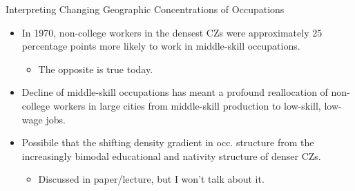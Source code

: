 \documentclass{beamer}
\begin{document}
\begin{frame}{Interpreting Changing Geographic Concentrations of Occupations}

\begin{itemize}
	
	\item In 1970, non-college workers in the densest CZs were approximately 25 percentage points more likely to work in middle-skill occupations.
	\begin{itemize}
		\item The opposite is true today.
	\end{itemize}
	
	\bigskip
	
	\item Decline of middle-skill occupations has meant a profound reallocation of non-college workers in large cities from middle-skill production to low-skill, low-wage jobs.
	
	\bigskip
	
	\item Possibile that the shifting density gradient in occ. structure from the increasingly bimodal educational and nativity structure of denser CZs.
	\begin{itemize}
		\item Discussed in paper/lecture, but I won't talk about it.
	\end{itemize}
	
	
\end{itemize}

\end{frame}
\end{document}
